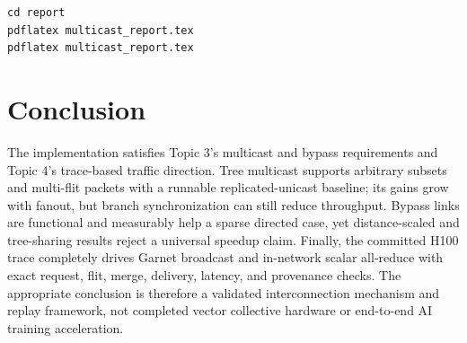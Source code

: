 \documentclass[10pt]{article}
\begin{document}
\begin{verbatim}
cd report
pdflatex multicast_report.tex
pdflatex multicast_report.tex
\end{verbatim}

\section{Conclusion}

The implementation satisfies Topic 3's multicast and bypass requirements and
Topic 4's trace-based traffic direction.  Tree multicast supports arbitrary
subsets and multi-flit packets with a runnable replicated-unicast baseline;
its gains grow with fanout, but branch synchronization can still reduce
throughput.  Bypass links are functional and measurably help a sparse directed
case, yet distance-scaled and tree-sharing results reject a universal speedup
claim.  Finally, the committed H100 trace completely drives Garnet broadcast
and in-network scalar all-reduce with exact request, flit, merge, delivery,
latency, and provenance checks.  The appropriate conclusion is therefore a
validated interconnection mechanism and replay framework, not completed
vector collective hardware or end-to-end AI training acceleration.
\end{document}
